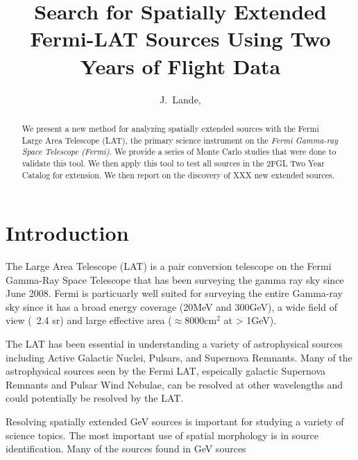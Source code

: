 \documentclass{emulateapj}
\begin{document}
\title{Search for Spatially Extended Fermi-LAT Sources Using Two Years of Flight
Data}

\author{
J.~Lande, 
}


\begin{abstract}
We present a new method for analyzing spatially extended sources with
the Fermi Large Area Telescope (LAT), the primary science instrument
on the {\em Fermi Gamma-ray Space Telescope (Fermi)}.  We provide a
series of Monte Carlo studies that were done to validate this tool.
We then apply this tool to test all sources in the 2FGL Two Year Catalog
for extension.\cite{2FGL} We then report on the discovery of XXX new
extended sources.
\end{abstract}

\section{Introduction}


The Large Area Telescope (LAT) is a pair conversion telescope on the
Fermi Gamma-Ray Space Telescope that has been surveying the gamma ray
sky since June 2008.  Fermi is particuarly well suited for surveying
the entire Gamma-ray sky since it has a broad energy coverage (20MeV
and 300GeV), a wide field of view (~2.4 sr) and large effective area
($\approx 8000 \text{cm}^2$ at > 1GeV).

The LAT has been essential in understanding a variety of astrophysical
sources including Active Galactic Nuclei, Pulsars, and Supernova Remnants.
Many of the astrophysical sources seen by the Fermi LAT, espeically
galactic Supernova Remnants and Pulsar Wind Nebulae, can be resolved at
other wavelengths and could potentially be resolved by the LAT.

Resolving spatially extended GeV sources is important for studying a
variety of science topics. The most important use of spatial morphology
is in source identification. Many of the sources found in GeV sources
\end{document}
